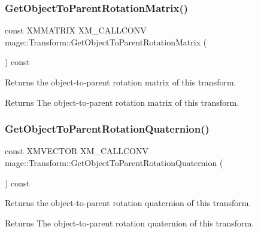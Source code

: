 \subsubsection{\texorpdfstring{Get\+Object\+To\+Parent\+Rotation\+Matrix()}{GetObjectToParentRotationMatrix()}}
{\footnotesize\ttfamily const X\+M\+M\+A\+T\+R\+IX X\+M\+\_\+\+C\+A\+L\+L\+C\+O\+NV mage\+::\+Transform\+::\+Get\+Object\+To\+Parent\+Rotation\+Matrix (\begin{DoxyParamCaption}{ }\end{DoxyParamCaption}) const\hspace{0.3cm}{\ttfamily [noexcept]}}

Returns the object-\/to-\/parent rotation matrix of this transform.

\begin{DoxyReturn}{Returns}
The object-\/to-\/parent rotation matrix of this transform. 
\end{DoxyReturn}
\mbox{\label{classmage_1_1_transform_a26cc5edc32e86bad8f3b798b39206998}} 
\subsubsection{\texorpdfstring{Get\+Object\+To\+Parent\+Rotation\+Quaternion()}{GetObjectToParentRotationQuaternion()}}
{\footnotesize\ttfamily const X\+M\+V\+E\+C\+T\+OR X\+M\+\_\+\+C\+A\+L\+L\+C\+O\+NV mage\+::\+Transform\+::\+Get\+Object\+To\+Parent\+Rotation\+Quaternion (\begin{DoxyParamCaption}{ }\end{DoxyParamCaption}) const\hspace{0.3cm}{\ttfamily [noexcept]}}

Returns the object-\/to-\/parent rotation quaternion of this transform.

\begin{DoxyReturn}{Returns}
The object-\/to-\/parent rotation quaternion of this transform. 
\end{DoxyReturn}
\mbox{\label{classmage_1_1_transform_af69febeb1c8795d4d3e71a712e4ab3b8}} 
